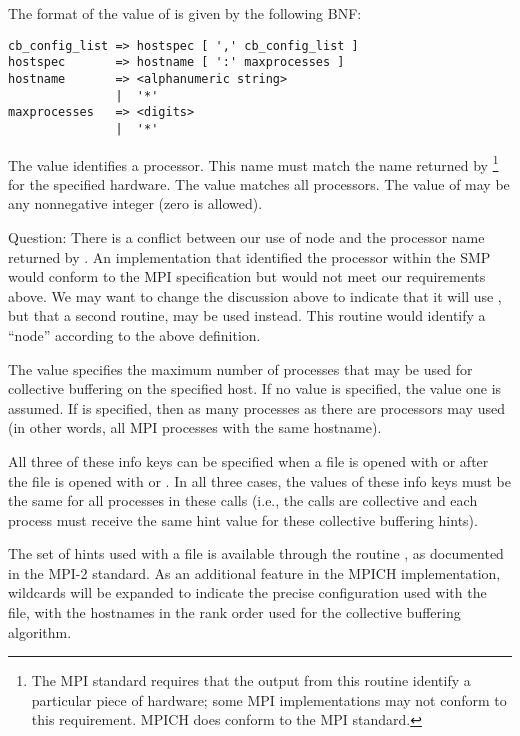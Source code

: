 The format of the value of  is given by the following BNF:
\begin{verbatim}
cb_config_list => hostspec [ ',' cb_config_list ]
hostspec       => hostname [ ':' maxprocesses ]
hostname       => <alphanumeric string>
               |  '*'
maxprocesses   => <digits>
               |  '*'
\end{verbatim}
The value  identifies a processor.  This name must match the
name returned by \footnote{The MPI standard
  requires that the output from this routine identify a particular piece of
  hardware; some MPI implementations may not conform to this requirement.
  MPICH does conform to the MPI standard.} for the specified hardware.
The value \code{*} matches all processors.  The value of 
may be any nonnegative integer (zero is allowed).

Question: There is a conflict between our use of node and the processor name
returned by .  An implementation that identified
the processor within the SMP would conform to the MPI specification but would
not meet our requirements above.  We may want to change the discussion above
to indicate that it will use , but that a second
routine,  may be used instead.  This routine would
identify a ``node'' according to the above definition.

The value  specifies the maximum number of processes that
may be used for collective buffering on the specified host.
If no value is specified, the value one is assumed.  If \code{*} is specified,
then as many processes as there are processors may used (in other words, all
MPI processes with the same hostname).

All three of these info keys can be specified when a file is opened with
 or after the file is opened with 
or .  In all three cases, the values of these info
keys must be the same for all processes in these calls (i.e., the calls are
collective and each process must receive the same hint value for these
collective buffering hints).

The set of hints used with a file is available through the routine
, as documented in the MPI-2 standard.  As an
additional feature in the MPICH implementation, wildcards will be expanded to
indicate the precise configuration used with the file, with the hostnames in
the rank order used for the collective buffering algorithm.


